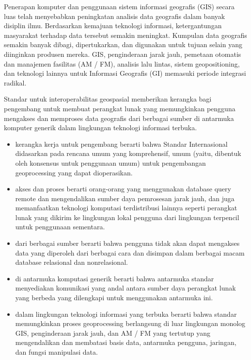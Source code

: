 Penerapan komputer dan penggunaan sistem informasi geografis (GIS) secara luas telah menyebabkan peningkatan analisis data geografis dalam banyak disiplin ilmu. Berdasarkan kemajuan teknologi informasi, ketergantungan masyarakat terhadap data tersebut semakin meningkat. Kumpulan data geografis semakin banyak dibagi, dipertukarkan, dan digunakan untuk tujuan
selain yang diinginkan produsen mereka. GIS, penginderaan jarak jauh, pemetaan otomatis dan manajemen fasilitas (AM / FM), analisis lalu lintas, sistem geopositioning, dan teknologi lainnya untuk Informasi Geografis (GI) memasuki periode integrasi radikal. 

Standar untuk interoperabilitas geospasial memberikan kerangka bagi pengembang untuk membuat perangkat lunak yang memungkinkan pengguna mengakses dan memproses data geografis dari berbagai sumber di antarmuka komputer generik dalam lingkungan teknologi informasi terbuka.
\begin{itemize}
\item kerangka kerja untuk pengembang berarti bahwa Standar Internasional didasarkan pada rencana umum yang komprehensif, umum (yaitu, dibentuk oleh konsensus untuk penggunaan umum) untuk pengembangan geoprocessing yang dapat dioperasikan.

\item akses dan proses berarti orang-orang yang menggunakan database query remote dan mengendalikan sumber daya pemrosesan jarak jauh, dan juga memanfaatkan teknologi komputasi terdistribusi lainnya seperti perangkat lunak yang dikirim ke lingkungan lokal pengguna dari lingkungan terpencil untuk penggunaan sementara.

\item dari berbagai sumber berarti bahwa pengguna tidak akan dapat mengakses data yang diperoleh dari berbagai cara dan disimpan dalam berbagai macam database relasional dan nonrelasional.

\item di antarmuka komputasi generik berarti bahwa antarmuka standar menyediakan komunikasi yang andal antara sumber daya perangkat lunak yang berbeda yang dilengkapi untuk menggunakan antarmuka ini.

\item dalam lingkungan teknologi informasi yang terbuka berarti bahwa standar memungkinkan proses geoprocessing berlangsung di luar lingkungan monolog GIS, penginderaan jarak jauh, dan AM / FM yang tertutup yang mengendalikan dan membatasi basis data, antarmuka pengguna, jaringan, dan fungsi manipulasi data\cite{lupp2008open}.
\end{itemize}
